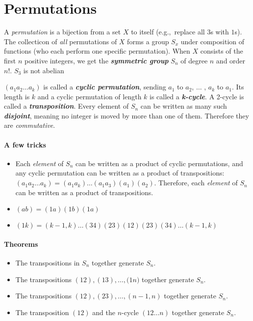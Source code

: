 \documentclass[a4paper,twocolumn,10pt]{article}
\begin{document}
  \section{Permutations}
  A \textit{permutation} is a bijection from a set $X$ to itself (e.g.,~replace
  all $3$s with $1$s).  The collecticon of \textit{all} permutations of
  $X$ forms a group $S_x$ under composition of functions (who each perform one
  specific permutation). When $X$ consists of the first $n$ positive integers,
  we get the \textbf{\textit{symmetric group}} $S_n$ of degree $n$ and order
  $n!$. $S_3$ is not abelian

  $(a_1a_2\ldots a_k)$ is called a \textbf{\textit{cyclic permutation}},
  sending $a_1$ to $a_2$, $\ldots$ , $a_k$ to $a_1$. Its length is $k$ and a
  cyclic permutation of length $k$ is called a \textbf{\textit{k-cycle}}. A
  2-cycle is called a \textbf{\textit{transposition}}. Every element of $S_n$
  can be written as many such \textbf{\textit{disjoint}}, meaning no integer is
  moved by more than one of them. Therefore they are \textit{commutative}.

  \paragraph{A few tricks}
  \begin{itemize}
    \item Each \textit{element} of $S_n$ can be written as a product of cyclic
      permutations, and any cyclic permutation can be written as a product of
      transpositions: $(a_1a_2 \ldots a_k) = (a_1a_k) \ldots (a_1a_3)(a_1)(a_2)$.
      Therefore, each \textit{element} of $S_n$ can be written as a product of
      transpositions.
    \item $(ab) = (1a)(1b)(1a)$
    \item $(1k) = (k-1,k)$$\ldots$$(34) (23) (12) (23) (34)$$\ldots$$(k-1,k)$
  \end{itemize}

  \paragraph{Theorems}
  \begin{itemize}
    \item The transpositions in $S_n$ together generate $S_n$.
    \item The transpositions $(12), (13), \ldots, ({1n)}$ together generate $S_n$.
    \item The transpositions $(12), (23), \ldots, (n-1,n)$ together generate $S_n$.
    \item The transposition $(12)$ and the $n$-cycle $(12 \ldots n)$ together
      generate $S_n$.
  \end{itemize}
\end{document}
